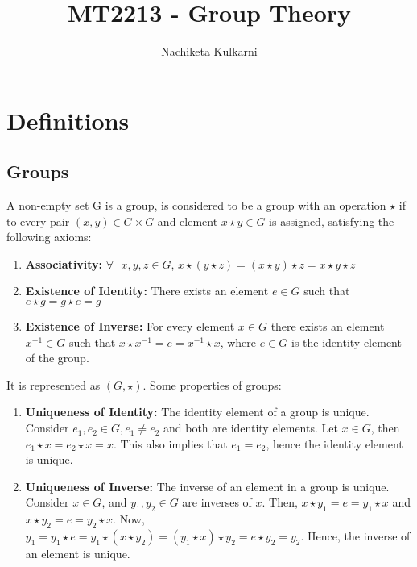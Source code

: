\documentclass[12pt, oneside]{book}
\date{}
\title{MT2213 - Group Theory}
\author{Nachiketa Kulkarni}
\begin{document}
\maketitle
\tableofcontents

\mainmatter
\chapter{Definitions}
\section{Groups}
A non-empty set G is a group, is considered to be a group with an operation \(\star\) if to every pair \( \left(x,y\right) \in G \times G\) and element \(x \star y \in G\) is assigned, satisfying the following axioms:
\begin{enumerate}
	\item \textbf{Associativity:} \(\forall\text{ } x,y,z \in G\), \(x \star \left(y \star z\right) = \left(x \star y \right) \star z = x \star y \star z \)
	\item \textbf{Existence of Identity:} There exists an element \(e \in G\) such that \(e \star g = g \star e = g\)
	\item \textbf{Existence of Inverse:} For every element \(x \in G\) there exists an element \(x^{-1} \in G\) such that \(x \star x^{-1} = e = x^{-1} \star x \), where \(e \in G\) is the identity element of the group.
\end{enumerate}
It is represented as \( \left(G, \star \right) \).
Some properties of groups:
\begin{enumerate}
	\item \textbf{Uniqueness of Identity:} The identity element of a group is unique.
	      Consider \(e_1, e_2 \in G, e_1 \neq e_2\) and both are identity elements.
	      Let \(x \in G\), then \( e_1 \star x = e_2 \star x = x \).
	      This also implies that \(e_1 = e_2\), hence the identity element is unique.
	\item \textbf{Uniqueness of Inverse:} The inverse of an element in a group is unique.
	      Consider \(x \in G\), and \(y_1, y_2 \in G\) are inverses of \(x\).
	      Then, \(x \star y_1 = e = y_1 \star x\) and \(x \star y_2 = e = y_2 \star x\).
	      Now, \(y_1 = y_1 \star e = y_1 \star \left(x \star y_2\right) = \left(y_1 \star x\right) \star y_2 = e \star y_2 = y_2\).
	      Hence, the inverse of an element is unique.
\end{enumerate}
\end{document}
